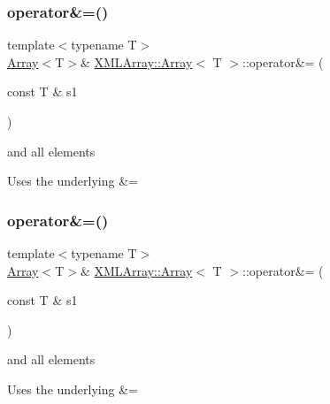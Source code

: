 \subsubsection{\texorpdfstring{operator\&=()}{operator\&=()}\hspace{0.1cm}{\footnotesize\ttfamily [5/6]}}
{\footnotesize\ttfamily template$<$typename T$>$ \\
\mbox{\hyperlink{classXMLArray_1_1Array}{Array}}$<$T$>$\& \mbox{\hyperlink{classXMLArray_1_1Array}{X\+M\+L\+Array\+::\+Array}}$<$ T $>$\+::operator\&= (\begin{DoxyParamCaption}\item[{const T \&}]{s1 }\end{DoxyParamCaption})\hspace{0.3cm}{\ttfamily [inline]}}



and all elements 

Uses the underlying \&= \mbox{\label{classXMLArray_1_1Array_a7f264e277398588e0e37763573f48fc7}} 
\subsubsection{\texorpdfstring{operator\&=()}{operator\&=()}\hspace{0.1cm}{\footnotesize\ttfamily [6/6]}}
{\footnotesize\ttfamily template$<$typename T$>$ \\
\mbox{\hyperlink{classXMLArray_1_1Array}{Array}}$<$T$>$\& \mbox{\hyperlink{classXMLArray_1_1Array}{X\+M\+L\+Array\+::\+Array}}$<$ T $>$\+::operator\&= (\begin{DoxyParamCaption}\item[{const T \&}]{s1 }\end{DoxyParamCaption})\hspace{0.3cm}{\ttfamily [inline]}}



and all elements 

Uses the underlying \&= \mbox{\label{classXMLArray_1_1Array_aaa5b7fcaa413265173fc75d3a5bbf837}} 
